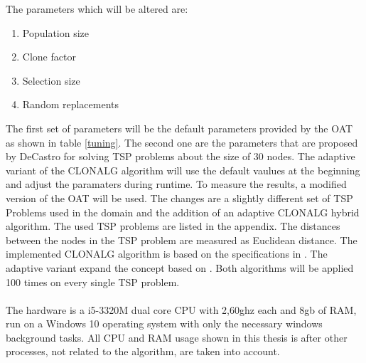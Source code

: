 The parameters which will be altered are:
\begin{enumerate}
	\item 	Population size
	\item 	Clone factor
	\item 	Selection size
	\item 	Random replacements	
\end{enumerate}
The first set of parameters will be the default parameters provided by the OAT as shown in table \ref{tuning}. The second one are the parameters that are proposed by DeCastro \cite{DEC02} for solving TSP problems about the size of 30 nodes.
The adaptive variant of the CLONALG algorithm will use the default vaulues at the beginning and adjust the paramaters during runtime.
To measure the results, a modified version of the OAT will be used. The changes are a slightly different set of TSP Problems used in the domain and the addition of an adaptive CLONALG hybrid algorithm. The used TSP problems are listed in the appendix. The distances between the nodes in the TSP problem are measured as Euclidean distance. The implemented CLONALG algorithm is based on the specifications in \cite{DEC02}. The adaptive variant expand the concept based on \cite{Garret04}.
Both algorithms will be applied 100 times on every single TSP problem.\\\\
The hardware is a i5-3320M dual core CPU with 2,60ghz each and 8gb of RAM, run on a Windows 10 operating system with only the necessary windows background tasks. All CPU and RAM usage shown in this thesis is after other processes, not related to the algorithm, are taken into account.
